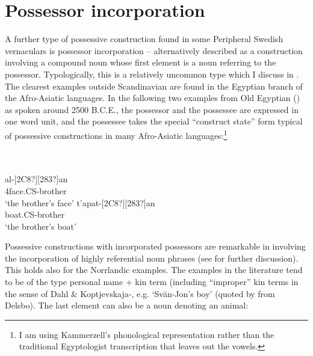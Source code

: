 
\section{Possessor incorporation}

A further type of possessive construction found in some Peripheral Swedish vernaculars is possessor incorporation – alternatively described as a construction involving a compound noun whose first element is a noun referring to the possessor. Typologically, this is a relatively uncommon type which I discuss in \citet{Dahl2004}. The clearest examples outside Scandinavian are found in the Egyptian branch of the Afro-Asiatic languages. In the following two examples from Old Egyptian (\citet{Kammerzell2000}) as spoken around 2500 B.C.E., the possessor and the possessee are expressed in one word unit, and the possessee takes the special “construct state” form typical of possessive constructions in many Afro-Asiatic languages:\footnote{ I am using Kammerzell’s phonological representation rather than the traditional Egyptologist transcription that leaves out the vowels.}


\ea
{}\\
\ea
{}\\
\gll [127?]al-[2C8?][283?]an\\
4face.CS-brother\\
\glt ‘the brother’s face’  
\ex
{}
\gll t’apat-[2C8?][283?]an\\
boat.CS-brother\\
\glt ‘the brother’s boat’
\z
\z

Possessive constructions with incorporated possessors are remarkable in involving the incorporation of highly referential noun phrases (see \citet{Dahl2004} for further discussion). This holds also for the Norrlandic examples. The examples in the literature tend to be of the type personal name + kin term (including “improper” kin terms in the sense of Dahl \& Koptjevskaja-\citet{Tamm2001}, e.g.  ‘Svän-Jon’s boy’ (quoted by \citet[38]{Delsing2003a} from Delsbo). The last element can also be a noun denoting an animal:

